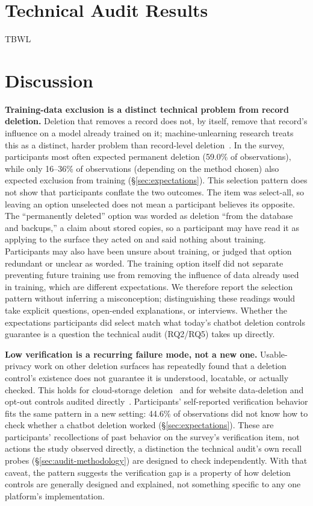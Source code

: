 \documentclass[conference,compsoc]{IEEEtran}
\begin{document}
\section{Technical Audit Results}
\label{sec:audit-results}
TBWL

\section{Discussion}
\label{sec:discussion}

\textbf{Training-data exclusion is a distinct technical problem from record
deletion.} Deletion that removes a record does not, by itself, remove
that record's influence on a model already trained on it; machine-unlearning
research treats this as a distinct, harder problem than record-level
deletion~\cite{bourtoule2021machine}. In the survey, participants most
often expected permanent deletion (59.0\% of observations), while only
16--36\% of observations (depending on the method chosen) also expected
exclusion from training (\S\ref{sec:expectations}). This selection pattern does not show that
participants conflate the two outcomes. The item was select-all, so leaving an
option unselected does not mean a participant believes its opposite. The
``permanently deleted'' option was worded as deletion ``from the database and
backups,'' a claim about stored copies, so a participant may have read it as
applying to the surface they acted on and said nothing about training.
Participants may also have been unsure about training, or judged that option
redundant or unclear as worded. The training option itself did not separate
preventing future training use from removing the influence of data already
used in training, which are different expectations. We therefore report the
selection pattern without inferring a misconception; distinguishing these
readings would take explicit questions, open-ended explanations, or
interviews. Whether the expectations participants did select match what
today's chatbot deletion controls guarantee is a question the technical
audit (RQ2/RQ5) takes up directly.

\textbf{Low verification is a recurring failure mode, not a new one.}
Usable-privacy work on other deletion surfaces has repeatedly found that
a deletion control's existence does not guarantee it is understood,
locatable, or actually checked. This holds for cloud-storage
deletion~\cite{ramokapane2017stupid} and for website data-deletion and
opt-out controls audited directly~\cite{habib2019empirical}.
Participants' self-reported verification behavior fits the same pattern
in a new setting: 44.6\% of observations did not know how
to check whether a chatbot deletion worked (\S\ref{sec:expectations}). These are participants' recollections of
past behavior on the survey's verification item, not actions the study
observed directly, a distinction the technical audit's own recall probes
(\S\ref{sec:audit-methodology}) are designed to check independently. With
that caveat, the pattern suggests the verification gap is a property of
how deletion controls are generally designed and explained, not something
specific to any one platform's implementation.
\end{document}
